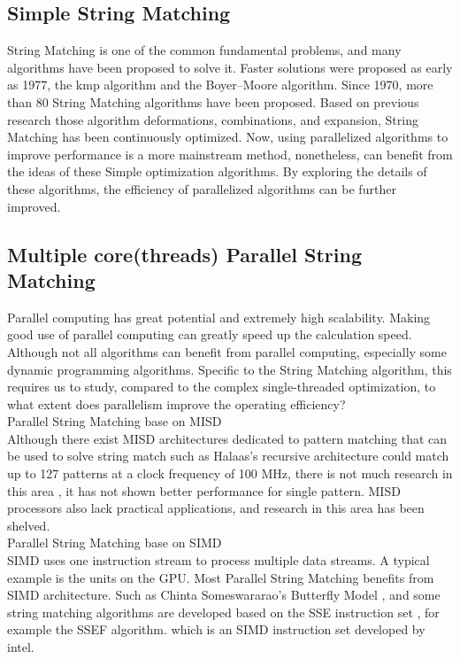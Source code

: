 \documentclass[11pt]{article}       %
\begin{document}
\subsection{Simple String Matching}\label{Simple}
String Matching is one of the common fundamental problems, and many algorithms have been proposed to solve it. Faster solutions were proposed as early as 1977, the kmp algorithm and the Boyer–Moore algorithm\cite{Matching}. Since 1970, more than 80 String Matching algorithms have been proposed. Based on previous research those algorithm deformations, combinations, and expansion, String Matching has been continuously optimized. Now, using parallelized algorithms to improve performance is a more mainstream method\cite{Matching}, nonetheless, can benefit from the ideas of these Simple optimization algorithms. By exploring the details of these algorithms, the efficiency of parallelized algorithms can be further improved. \\

\subsection{Multiple core(threads) Parallel String Matching}\label{Multiple}
Parallel computing has great potential and extremely high scalability. Making good use of parallel computing can greatly speed up the calculation speed. Although not all algorithms can benefit from parallel computing, especially some dynamic programming algorithms. Specific to the String Matching algorithm, this requires us to study, compared to the complex single-threaded optimization, to what extent does parallelism improve the operating efficiency? \\

Parallel String Matching base on MISD\\
Although there exist MISD architectures dedicated to pattern matching that can be used to solve string match such as Halaas's recursive architecture \cite{MISD} could match up to 127 patterns at a clock frequency of 100 MHz, there is not much research in this area , it has not shown better performance for single pattern. MISD processors also lack practical applications, and research in this area has been shelved. \\


Parallel String Matching base on SIMD\\
SIMD uses one instruction stream to process multiple data streams. A typical example is the units on the GPU. Most Parallel String Matching benefits from SIMD architecture. Such as Chinta Someswararao's Butterfly Model \cite{Butterfly}, and some string matching algorithms are developed based on the SSE instruction set \cite{Matching}, for example the SSEF algorithm. which is an SIMD instruction set developed by intel. \\
\end{document}
